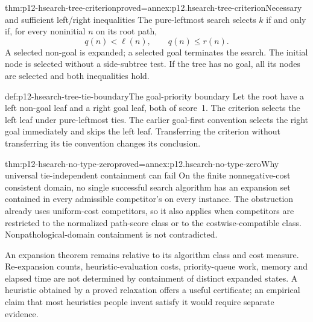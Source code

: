 \begin{hbtheorem}{thm:p12-hsearch-tree-criterion}{proved=annex:p12.hsearch-tree-criterion}{Necessary and sufficient left/right inequalities}
The pure-leftmost search selects \(k\) if and only if, for every
noninitial \(n\) on its root path,
\[
                 q(n)<\ell(n),\qquad q(n)\le r(n).
\]
A selected non-goal is expanded; a selected goal terminates the search.
The initial node is selected without a side-subtree test. If the tree
has no goal, all its nodes are selected and both inequalities hold.
\end{hbtheorem}

\begin{hbexample}{def:p12-hsearch-tree-tie-boundary}{The goal-priority boundary}
Let the root have a left non-goal leaf and a right goal leaf, both of
score~1. The criterion selects the left leaf under pure-leftmost ties.
The earlier goal-first convention selects the right goal immediately
and skips the left leaf. Transferring the criterion without transferring
its tie convention changes its conclusion.
\end{hbexample}

\begin{hbtheorem}{thm:p12-hsearch-no-type-zero}{proved=annex:p12.hsearch-no-type-zero}{Why universal tie-independent containment can fail}
On the finite nonnegative-cost consistent domain, no single successful
search algorithm has an expansion set contained in every admissible
competitor's on every instance. The obstruction already uses
uniform-cost competitors, so it also applies when competitors are
restricted to the normalized path-score class or to the costwise-compatible
class. Nonpathological-domain containment is not contradicted.
\end{hbtheorem}

An expansion theorem remains relative to its algorithm class and cost
measure. Re-expansion counts, heuristic-evaluation costs, priority-queue
work, memory and elapsed time are not determined by containment of
distinct expanded states. A heuristic obtained by a proved relaxation
offers a useful certificate; an empirical claim that most heuristics
people invent satisfy it would require separate evidence.

